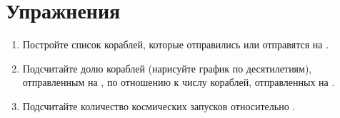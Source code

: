 \section{Упражнения}
\begin{enumerate}
  \item Постройте список кораблей, которые отправились или отправятся на .
  \item Подсчитайте долю кораблей (нарисуйте график по десятилетиям), 
        отправленным на , 
        по отношению к числу кораблей, отправленных на .
  \item Подсчитайте количество  космических запусков 
      относительно .%
%
\end{enumerate}
